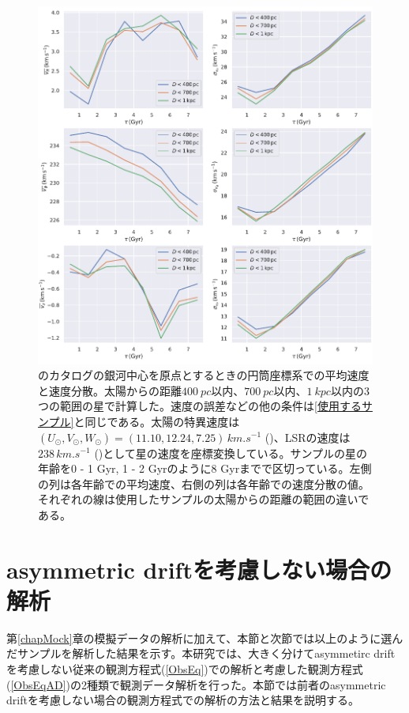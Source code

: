 \begin{figure}[p]
\begin{center}
	\includegraphics[width=15cm]{fig/v_sigma.pdf}
	\caption{\cite{SD18}のカタログの銀河中心を原点とするときの円筒座標系での平均速度と速度分散。太陽からの距離$\SI{400}{pc}$以内、$\SI{700}{pc}$以内、$\SI{1}{kpc}$以内の3つの範囲の星で計算した。速度の誤差などの他の条件は\ref{使用するサンプル}と同じである。太陽の特異速度は$(U_{\odot},V_{\odot},W_{\odot}) = (11.10,12.24,7.25)\,\si{km.s^{-1}}$ (\cite{Schonrich2010})、LSRの速度は$238\,\si{km.s^{-1}}$ (\cite{BH2016})として星の速度を座標変換している。サンプルの星の年齢を0 - 1 Gyr, 1 - 2 Gyrのように8 Gyrまでで区切っている。左側の列は各年齢での平均速度、右側の列は各年齢での速度分散の値。それぞれの線は使用したサンプルの太陽からの距離の範囲の違いである。}
	\label{fig:v_sigma}
\end{center}
\end{figure}


\section{asymmetric driftを考慮しない場合の解析 \label{asymmetric driftを考慮しない場合の解析}}
第\ref{chapMock}章の模擬データの解析に加えて、本節と次節では以上のように選んだサンプルを解析した結果を示す。本研究では、大きく分けてasymmetirc driftを考慮しない従来の観測方程式(\ref{ObsEq})での解析と考慮した観測方程式(\ref{ObsEqAD})の2種類で観測データ解析を行った。本節では前者のasymmetric driftを考慮しない場合の観測方程式での解析の方法と結果を説明する。

